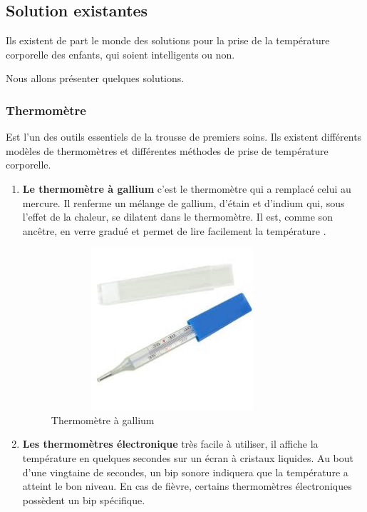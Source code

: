 \documentclass[12pt]{article}
\begin{document}
\subsection{Solution existantes}
Ils existent de part le monde des solutions pour la prise de la température corporelle des enfants, qui soient intelligents ou non.

Nous allons présenter quelques solutions.
\subsubsection{Thermomètre}
Est l’un des outils essentiels de la trousse de premiers soins. Ils existent différents modèles de thermomètres et différentes méthodes de prise de température corporelle.
\begin{enumerate}
	\item \textbf{Le thermomètre à gallium} c’est le thermomètre qui a remplacé celui au mercure. Il renferme un mélange de gallium, d’étain et d’indium qui, sous l’effet de la chaleur, se dilatent dans le thermomètre. Il est, comme son ancêtre, en verre gradué et permet de lire facilement la température \cite{36}.
	\begin{figure}[h]
		\centering
		\includegraphics[height=6cm,width=9cm]{img-Chapiter-2/galune.jpeg}
		\caption{Thermomètre à gallium}
		\label{fig:gallium}
	\end{figure}
	\newpage
	\item \textbf{Les thermomètres électronique} très facile à utiliser, il affiche la température en quelques secondes sur un écran à cristaux liquides. Au bout d’une vingtaine de secondes, un bip sonore indiquera que la température a atteint le bon niveau. En cas de fièvre, certains thermomètres électroniques possèdent un bip spécifique. 
	

\end{enumerate}
\end{document}
